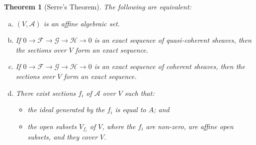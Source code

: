 \documentclass{article}
\theoremstyle{plain}
\newtheorem*{theorem}{Theorem}
\newcommand{\sh}{\mathscr}
\begin{document}
\begin{theorem}[Serre's Theorem]
  The following are equivalent:
  \begin{enumerate}[(a)]
    \item $(V,\sh{A})$ is an affine algebraic set.
    \item If $0\to\sh{F}\to\sh{G}\to\sh{H}\to0$ is an exact sequence of quasi-coherent sheaves, then the sections over $V$ form an exact sequence.
    \item If $0\to\sh{F}\to\sh{G}\to\sh{H}\to0$ is an exact sequence of coherent sheaves, then the sections over $V$ form an exact sequence.
    \item There exist sections $f_i$ of $\sh{A}$ over $V$ such that:
      \begin{itemize}
        \item the ideal generated by the $f_i$ is equal to $A$; and
        \item the open subsets $V_{f_i}$ of $V$, where the $f_i$ are non-zero, are affine open subsets, and they cover $V$.
      \end{itemize}
  \end{enumerate}
\end{theorem}
\end{document}
